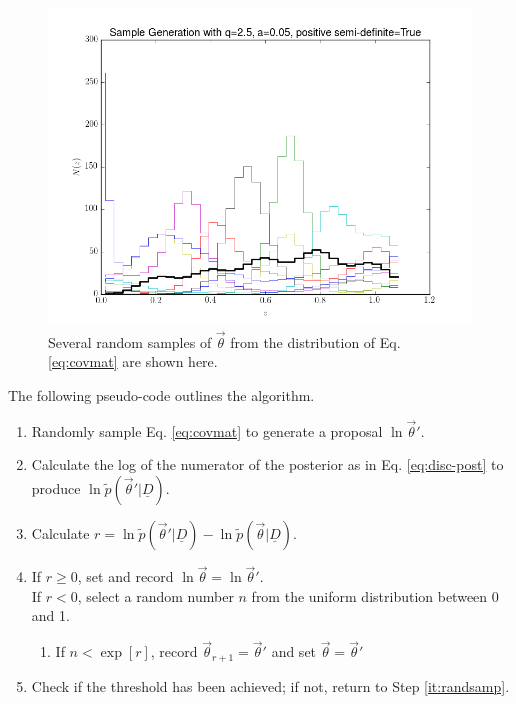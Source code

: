 \documentclass[12pt, onecolumn]{emulateapj}
\newcommand{\textul}{\underline}
\begin{document}
\begin{figure}
\label{fig:priors}
\includegraphics[scale=0.5]{samples5.png}
\caption{Several random samples of $\vec{\theta}$ from the distribution of Eq. \ref{eq:covmat} are shown here.  %
}
\end{figure}

The following pseudo-code outlines the algorithm.

\begin{enumerate}
\item \label{it:randsamp} Randomly sample Eq. \ref{eq:covmat} to generate a proposal $\ln\vec{\theta}'$.
\item Calculate the log of the numerator of the posterior as in Eq. \ref{eq:disc-post} to produce $\ln\tilde{p}(\vec{\theta}'|\textul{D})$.
\item Calculate $r=\ln\tilde{p}(\vec{\theta}'|\textul{D})-\ln\tilde{p}(\vec{\theta}|\textul{D})$.
\item If $r\geq0$, set and record $\ln\vec{\theta}=\ln\vec{\theta}'$.\\
If $r<0$, select a random number $n$ from the uniform distribution between 0 and 1.
\begin{enumerate}
\item If $n<\exp[r]$, record $\vec{\theta}_{r+1}=\vec{\theta}'$ and set $\vec{\theta}=\vec{\theta}'$
\end{enumerate}
\item Check if the threshold has been achieved; if not, return to Step \ref{it:randsamp}.
\end{enumerate}
\end{document}
